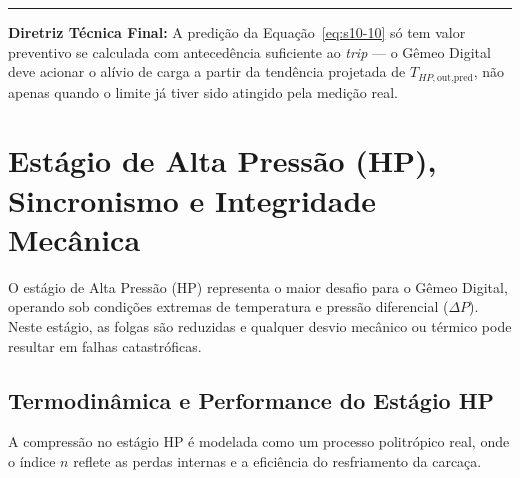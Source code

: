 \documentclass[12pt,a4paper]{article}
\numberwithin{equation}{section}
\numberwithin{table}{section}
\numberwithin{figure}{section}
\begin{document}
	\vspace{1em}
	\hrule
	\vspace{1em}

	\textbf{Diretriz Técnica Final:} A predição da Equação~\eqref{eq:s10-10} só tem valor preventivo se calculada com antecedência suficiente ao \textit{trip} — o Gêmeo Digital deve acionar o alívio de carga a partir da tendência projetada de $T_{HP,\text{out,pred}}$, não apenas quando o limite já tiver sido atingido pela medição real.

	
	
	\section{\textbf{Estágio de Alta Pressão (HP), Sincronismo e Integridade Mecânica}}
	
	O estágio de Alta Pressão (HP) representa o maior desafio para o Gêmeo Digital, operando sob condições extremas de temperatura e pressão diferencial ($\Delta P$). Neste estágio, as folgas são reduzidas e qualquer desvio mecânico ou térmico pode resultar em falhas catastróficas.
	
	\subsection{\textbf{Termodinâmica e Performance do Estágio HP}}
	A compressão no estágio HP é modelada como um processo politrópico real, onde o índice $n$ reflete as perdas internas e a eficiência do resfriamento da carcaça.
	
\end{document}
